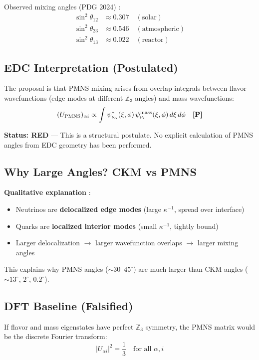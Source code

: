 Observed mixing angles (PDG 2024) \tagBL{}:
\begin{align}
    \sin^2\theta_{12} &\approx 0.307 \quad (\text{solar}) \\
    \sin^2\theta_{23} &\approx 0.546 \quad (\text{atmospheric}) \\
    \sin^2\theta_{13} &\approx 0.022 \quad (\text{reactor})
\end{align}

\subsection{EDC Interpretation (Postulated)}

The proposal is that PMNS mixing arises from overlap integrals between
flavor wavefunctions (edge modes at different $\mathbb{Z}_3$ angles) and
mass wavefunctions:
\begin{equation}
    (U_{\text{PMNS}})_{\alpha i} \propto \int \psi^*_{\nu_\alpha}(\xi, \phi) \,
    \psi_{\nu_i}^{\text{mass}}(\xi, \phi) \, d\xi \, d\phi
    \quad \textbf{[P]}{}
\end{equation}

\textbf{Status: RED} --- This is a structural postulate. No explicit calculation
of PMNS angles from EDC geometry has been performed.

\subsection{Why Large Angles? CKM vs PMNS}

\textbf{Qualitative explanation} \tagI{}:
\begin{itemize}[nosep]
\item Neutrinos are \textbf{delocalized edge modes} (large $\kappa^{-1}$, spread over interface)
\item Quarks are \textbf{localized interior modes} (small $\kappa^{-1}$, tightly bound)
\item Larger delocalization $\to$ larger wavefunction overlaps $\to$ larger mixing angles
\end{itemize}
This explains why PMNS angles ($\sim 30$--$45^\circ$) are much larger than CKM angles
($\sim 13^\circ$, $2^\circ$, $0.2^\circ$).

\subsection{DFT Baseline (Falsified)}

If flavor and mass eigenstates have perfect $\mathbb{Z}_3$ symmetry, the PMNS
matrix would be the discrete Fourier transform:
\begin{equation}
    |U_{\alpha i}|^2 = \frac{1}{3} \quad \text{for all } \alpha, i
\end{equation}

